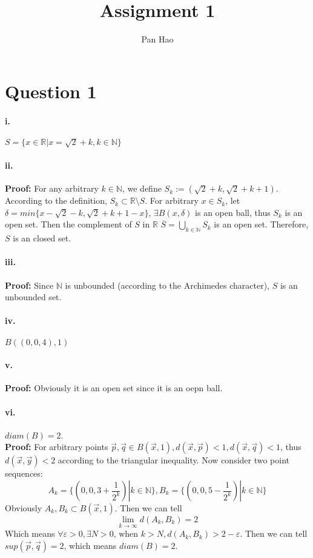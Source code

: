 \documentclass[11pt, a4paper]{article}
\begin{document}
\title{Assignment 1}
\author{Pan Hao}
\date{}
\maketitle
\section*{Question 1} 

\paragraph{i.}
$S = \{x \in \mathbb{R} | x = \sqrt {2} + k, k \in \mathbb{N} \}$ 

\paragraph{ii.}
\textbf{Proof:} For any arbitrary $k\in \mathbb{N}$, we define $S_k := (\sqrt{2} + k, \sqrt{2} + k + 1)$. \\ 
According to the definition, $S_k \subset \mathbb{R} \setminus S$. For arbitrary $x \in S_k$, let $\delta = min\{x- \sqrt{2} - k, \sqrt{2} + k + 1 - x\}$, $\exists B(x, \delta)$ is an open ball, thus $S_k$ is an open set.
Then the complement of $S$ in $\mathbb{R}$ $\overline{S} = \bigcup_{k \in \mathbb{N}} S_k$ is an open set. Therefore, $S$ is an closed set.

\paragraph{iii.}
\textbf{Proof:} Since $\mathbb{N}$ is unbounded (according to the Archimedes character), $S$ is an unbounded set.

\paragraph{iv.}
$B((0, 0, 4), 1)$

\paragraph{v.}
\textbf{Proof:} Obviously it is an open set since it is an oepn ball.

\paragraph{vi.}
$diam(B) = 2$.\\
\textbf{Proof:} For arbitrary points $\vec{p}, \vec{q} \in B(\vec{x}, 1), d(\vec{x}, \vec{p}) < 1, d(\vec{x}, \vec{q}) < 1$, thus $d(\vec{x}, \vec{y}) < 2$ according to the triangular inequality.
Now consider two point sequences:
$$A_k = \{ (0, 0, 3 + \frac{1}{2 ^ k}) | k \in \mathbb{N} \}, B_k = \{ (0, 0, 5 - \frac{1}{2 ^ k}) | k \in \mathbb{N} \}$$
Obviously $A_k, B_k \subset B(\vec{x}, 1)$.
Then we can tell
$$\lim_{k \to \infty} d(A_k, B_k) = 2$$
Which means $\forall \varepsilon > 0, \exists N > 0$, when $k > N, d(A_k, B_k) > 2 - \varepsilon$. Then we can tell $sup(\vec{p}, \vec{q}) = 2$, which means $diam(B) = 2$.
\end{document}
